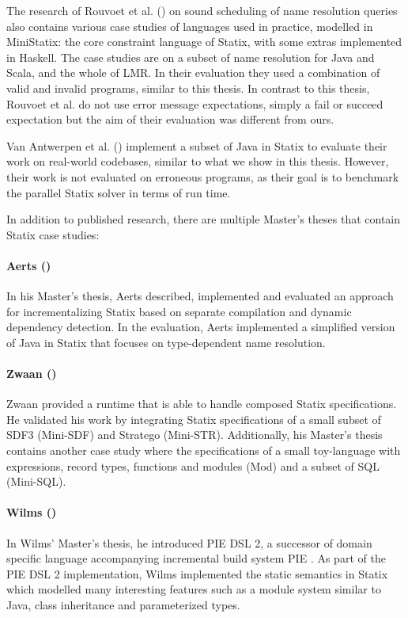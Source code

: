       The research of Rouvoet et al. (\citeyear{RouvoetAPKV20}) on sound scheduling of name resolution queries also contains various case studies of languages used in practice, modelled in MiniStatix: the core constraint language of Statix, with some extras implemented in Haskell. The case studies are on a subset of name resolution for Java and Scala, and the whole of LMR. In their evaluation they used a combination of valid and invalid programs, similar to this thesis. In contrast to this thesis, Rouvoet et al. do not use error message expectations, simply a fail or succeed expectation but the aim of their evaluation was different from ours. 

      Van Antwerpen et al. (\citeyear{AntwerpenV21}) implement a subset of Java in Statix to evaluate their work on real-world codebases, similar to what we show in this thesis. However, their work is not evaluated on erroneous programs, as their goal is to benchmark the parallel Statix solver in terms of run time.

      In addition to published research, there are multiple Master's theses that contain Statix case studies:

      \paragraph{Aerts (\citeyear{Aerts2019})} In his Master's thesis, Aerts described, implemented and evaluated an approach for incrementalizing Statix based on separate compilation and dynamic dependency detection. In the evaluation, Aerts implemented a simplified version of Java in Statix that focuses on type-dependent name resolution.

      \paragraph{Zwaan (\citeyear{Zwaan2021})} Zwaan provided a runtime that is able to handle composed Statix specifications. He validated his work by integrating Statix specifications of a small subset of SDF3 (Mini-SDF) and Stratego (Mini-STR). Additionally, his Master's thesis contains another case study where the specifications of a small toy-language with expressions, record types, functions and modules (Mod) and a subset of SQL (Mini-SQL).

      \paragraph{Wilms (\citeyear{Wilms2022})} In Wilms' Master's thesis, he introduced PIE DSL 2, a successor of domain specific language accompanying incremental build system PIE \autocite{KonatSEV19}. As part of the PIE DSL 2 implementation, Wilms implemented the static semantics in Statix which modelled many interesting features such as a module system similar to Java, class inheritance and parameterized types.

